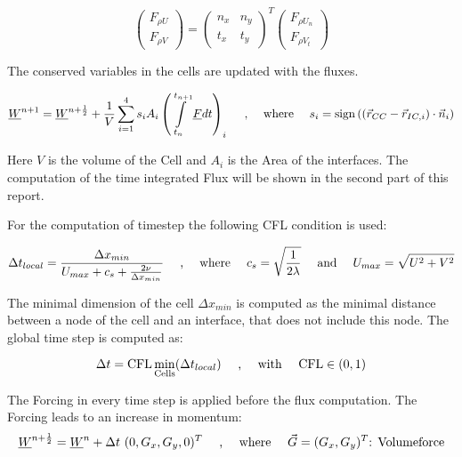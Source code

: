 \documentclass[
	pdftex,             %
	12pt,				%
	a4paper,		   	%
	english,				%
	oneside,			%
]{article}
\newcommand{\uu}[1]{\underline{#1}}
\newcommand{\vv}[1]{\vec{#1}}
\DeclareMathOperator{\sign}{sign}
\begin{document}
\begin{equation}
\begin{pmatrix} F_{\rho U} \\ F_{\rho V} \end{pmatrix}
=
\begin{pmatrix} n_x & n_y \\ t_x & t_y \end{pmatrix}^T
\begin{pmatrix} F_{\rho U_n} \\ F_{\rho V_t} \end{pmatrix}
\end{equation}

The conserved variables in the cells are updated with the fluxes.

\begin{equation}
\uu{W}^{n+1} = \uu{W}^{n+\frac{1}{2}} + \dfrac{1}{V}\sum \limits_{i=1}^4 s_i A_i \left( \int \limits_{t_n}^{t_{n+1}} \uu{F} dt  \right)_i
\textnormal{~~~~,~~~~where~~~~}
s_i = \sign \left( \left( \vv{r}_{CC} - \vv{r}_{IC, i} \right) \cdot \vv{n}_i \right)
\end{equation}

Here $V$ is the volume of the Cell and $A_i$ is the Area of the interfaces. The computation of the time integrated Flux will be shown in the second part of this report.

For the computation of timestep the following CFL condition is used:

\begin{equation}
\Delta t_{local} = \dfrac{\Delta x_{min}}{U_{max} + c_s + \frac{2 \nu}{\Delta x_{min}}}
\textnormal{~~~~,~~~~where~~~~}
c_s = \sqrt{\frac{1}{2 \lambda}}
\textnormal{~~~~and~~~~}
U_{max} = \sqrt{U^2 + V^2}
\end{equation}

The minimal dimension of the cell $\Delta x_{min}$ is computed as the minimal distance between a node of the cell and an interface, that does not include this node. The global time step is computed as:

\begin{equation}
\Delta t = \textnormal{CFL} \min \limits_{\textnormal{Cells}}(\Delta t_{local})
\textnormal{~~~~,~~~~with~~~~}
\textnormal{CFL} \in (0, 1)
\end{equation}

The Forcing in every time step is applied before the flux computation. The Forcing leads to an increase in momentum:
\begin{equation}
\uu{W}^{n+\frac{1}{2}}
=
\uu{W}^{n} + 
\Delta t ~ (0, G_x, G_y, 0)^T
\textnormal{~~~~,~~~~where~~~~}
\vv{G} = (G_x, G_y)^T \textnormal{: Volumeforce}
\end{equation}
\end{document}
